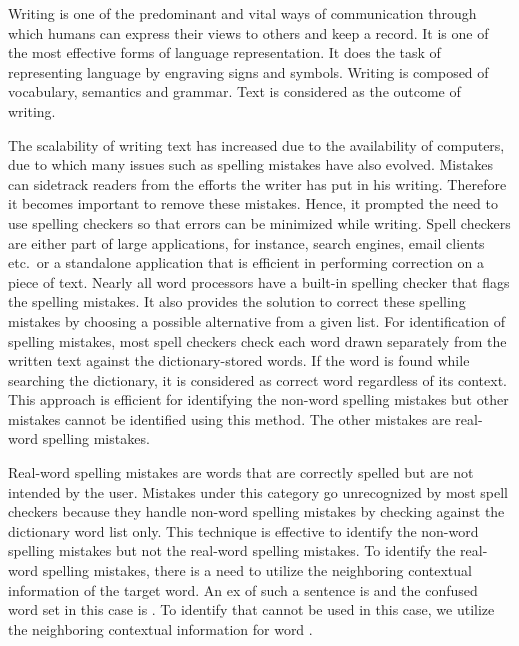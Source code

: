 
Writing is one of the predominant and vital ways of communication through which
humans can express their views to others and keep a record. It is one of the
most effective forms of language representation. It does the task of
representing language by engraving signs and symbols. Writing is composed of
vocabulary, semantics and grammar. Text is considered as the outcome of
writing.

The scalability of writing text has increased due to the availability of
computers, due to which many issues such as spelling mistakes have also
evolved. Mistakes can sidetrack readers from the efforts the writer has put in
his writing. Therefore it becomes important to remove these mistakes. Hence, it
prompted the need to use spelling checkers so that errors can be minimized
while writing. Spell checkers are either part of large applications, for
instance, search engines, email clients etc.\ or a standalone application that
is efficient in performing correction on a piece of text. Nearly all word
processors have a built-in spelling checker that flags the spelling mistakes.
It also provides the solution to correct these spelling mistakes by choosing a
possible alternative from a given list. For identification of spelling
mistakes, most spell checkers check each word drawn separately from the written
text against the dictionary-stored words. If the word is found while searching
the dictionary, it is considered as correct word regardless of its context.
This approach is efficient for identifying the non-word spelling mistakes but
other mistakes cannot be identified using this method. The other mistakes are
real-word spelling mistakes.

Real-word spelling mistakes are words that are correctly spelled but are not
intended by the user. Mistakes under this category go unrecognized by most
spell checkers because they handle non-word spelling mistakes by checking
against the dictionary word list only. This technique is effective to identify
the non-word spelling mistakes but not the real-word spelling mistakes. To
identify the real-word spelling mistakes, there is a need to utilize the
neighboring contextual information of the target word. An ex of such a
sentence is  and the confused word
set in this case is . To identify that
 cannot be used in this case, we utilize the neighboring
contextual information  for word .
